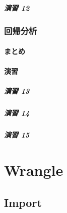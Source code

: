 \documentclass[
  12pt,
]{book}
\begin{document}
\hypertarget{ux6f14ux7fd2-12}{%
\subsubsection*{演習 12}\label{ux6f14ux7fd2-12}}

\hypertarget{ux56deux5e30ux5206ux6790}{%
\section{回帰分析}\label{ux56deux5e30ux5206ux6790}}

\hypertarget{ux307eux3068ux3081-5}{%
\subsection{まとめ}\label{ux307eux3068ux3081-5}}

\hypertarget{ux6f14ux7fd2-13}{%
\subsection{演習}\label{ux6f14ux7fd2-13}}

\hypertarget{ux6f14ux7fd2-13-1}{%
\subsubsection*{演習 13}\label{ux6f14ux7fd2-13-1}}

\hypertarget{ux6f14ux7fd2-14}{%
\subsubsection*{演習 14}\label{ux6f14ux7fd2-14}}

\hypertarget{ux6f14ux7fd2-15}{%
\subsubsection*{演習 15}\label{ux6f14ux7fd2-15}}

\hypertarget{part-wrangle}{%
\part{Wrangle}\label{part-wrangle}}

\hypertarget{import-1}{%
\chapter{Import}\label{import-1}}
\end{document}
